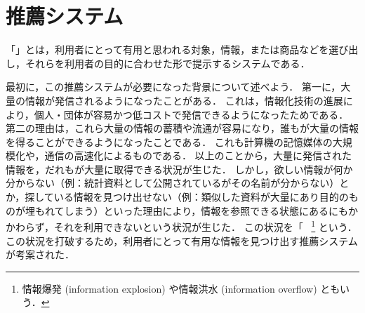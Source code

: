 \chapter{推薦システム}
\label{sec:intro}

「」とは，利用者にとって有用と思われる対象，情報，または商品などを選び出し，それらを利用者の目的に合わせた形で提示するシステムである．

最初に，この推薦システムが必要になった背景について述べよう．
第一に，大量の情報が発信されるようになったことがある．
これは，情報化技術の進展により，個人・団体が容易かつ低コストで発信できるようになったためである．
第二の理由は，これら大量の情報の蓄積や流通が容易になり，誰もが大量の情報を得ることができるようになったことである．
これも計算機の記憶媒体の大規模化や，通信の高速化によるものである．
以上のことから，大量に発信された情報を，だれもが大量に取得できる状況が生じた．
しかし，欲しい情報が何か分からない（例：統計資料として公開されているがその名前が分からない）とか，探している情報を見つけ出せない（例：類似した資料が大量にあり目的のものが埋もれてしまう）といった理由により，情報を参照できる状態にあるにもかかわらず，それを利用できないという状況が生じた．
この状況を「~\cite{misc:009}
\footnote{情報爆発 (information explosion) や情報洪水 (information overflow) ともいう．}
という．
この状況を打破するため，利用者にとって有用な情報を見つけ出す推薦システムが考案された．


